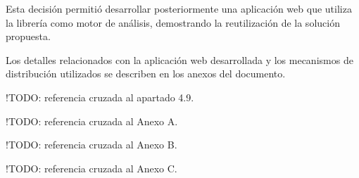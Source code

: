 Esta decisión permitió desarrollar posteriormente una aplicación web que
utiliza la librería como motor de análisis, demostrando la reutilización
de la solución propuesta.

Los detalles relacionados con la aplicación web desarrollada y los
mecanismos de distribución utilizados se describen en los anexos del
documento.

!TODO: referencia cruzada al apartado 4.9.

!TODO: referencia cruzada al Anexo A.

!TODO: referencia cruzada al Anexo B.

!TODO: referencia cruzada al Anexo C.
